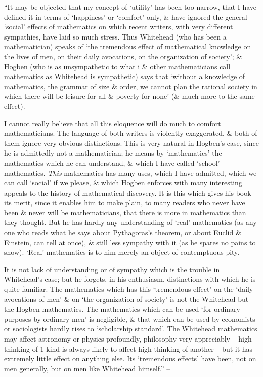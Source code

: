 \documentclass{article}
\numberwithin{equation}{section}
\begin{document}
 ``It may be objected that my concept of `utility' has been too narrow, that I have defined it in terms of `happiness' or `comfort' only, \& have ignored the general `social' effects of mathematics on which recent writers, with very different sympathies, have laid so much stress. Thus Whitehead (who has been a mathematician) speaks of `the tremendous effect of mathematical knowledge on the lives of men, on their daily avocations, on the organization of society'; \& Hogben (who is as unsympathetic to what i \& other mathematicians call mathematics as Whitehead is sympathetic) says that `without a knowledge of mathematics, the grammar of size \& order, we cannot plan the rational society in which there will be leisure for all \& poverty for none' (\& much more to the same effect).

I cannot really believe that all this eloquence will do much to comfort mathematicians. The language of both writers is violently exaggerated, \& both of them ignore very obvious distinctions. This is very natural in Hogben's case, since he is admittedly not a mathematician; he means by `mathematics' the mathematics which he can understand, \& which I have called `school' mathematics. \textit{This} mathematics has many uses, which I have admitted, which we can call `social' if we please, \& which Hogben enforces with many interesting appeals to the history of mathematical discovery. It is this which gives his book its merit, since it enables him to make plain, to many readers who never have been \& never will be mathematicians, that there is more in mathematics than they thought. But he has hardly any understanding of `real' mathematics (as any one who reads what he says about Pythagoras's theorem, or about Euclid \& Einstein, can tell at once), \& still less sympathy with it (as he spares no pains to show). `Real' mathematics is to him merely an object of contemptuous pity.

It is not lack of understanding or of sympathy which is the trouble in Whitehead's case; but he forgets, in his enthusiasm, distinctions with which he is quite familiar. The mathematics which has this `tremendous effect' on the `daily avocations of men' \& on `the organization of society' is not the Whitehead but the Hogben mathematics. The mathematics which can be used `for ordinary purposes by ordinary men' is negligible, \& that which can be used by economists or sociologists hardly rises to `scholarship standard'. The Whitehead mathematics may affect astronomy or physics profoundly, philosophy very appreciably -- high thinking of 1 kind is always likely to affect high thinking of another -- but it has extremely little effect on anything else. Its `tremendous effects' have been, not on men generally, but on men like Whitehead himself.'' -- \cite[pp. 136--138]{Hardy1992}
\end{document}

